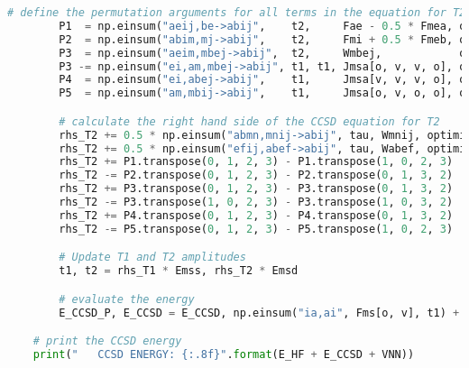 \begin{lstlisting}[language=Python, caption={\acrshort{ccd} and \acrshort{ccsd} method exercise code solution.}, label=code:cc_solution]
        # define the permutation arguments for all terms in the equation for T2
        P1  = np.einsum("aeij,be->abij",    t2,     Fae - 0.5 * Fmea, optimize=True)
        P2  = np.einsum("abim,mj->abij",    t2,     Fmi + 0.5 * Fmeb, optimize=True)
        P3  = np.einsum("aeim,mbej->abij",  t2,     Wmbej,            optimize=True)
        P3 -= np.einsum("ei,am,mbej->abij", t1, t1, Jmsa[o, v, v, o], optimize=True)
        P4  = np.einsum("ei,abej->abij",    t1,     Jmsa[v, v, v, o], optimize=True)
        P5  = np.einsum("am,mbij->abij",    t1,     Jmsa[o, v, o, o], optimize=True)

        # calculate the right hand side of the CCSD equation for T2
        rhs_T2 += 0.5 * np.einsum("abmn,mnij->abij", tau, Wmnij, optimize=True)
        rhs_T2 += 0.5 * np.einsum("efij,abef->abij", tau, Wabef, optimize=True)
        rhs_T2 += P1.transpose(0, 1, 2, 3) - P1.transpose(1, 0, 2, 3)
        rhs_T2 -= P2.transpose(0, 1, 2, 3) - P2.transpose(0, 1, 3, 2)
        rhs_T2 += P3.transpose(0, 1, 2, 3) - P3.transpose(0, 1, 3, 2)
        rhs_T2 -= P3.transpose(1, 0, 2, 3) - P3.transpose(1, 0, 3, 2)
        rhs_T2 += P4.transpose(0, 1, 2, 3) - P4.transpose(0, 1, 3, 2)
        rhs_T2 -= P5.transpose(0, 1, 2, 3) - P5.transpose(1, 0, 2, 3)

        # Update T1 and T2 amplitudes
        t1, t2 = rhs_T1 * Emss, rhs_T2 * Emsd

        # evaluate the energy
        E_CCSD_P, E_CCSD = E_CCSD, np.einsum("ia,ai", Fms[o, v], t1) + 0.25 * np.einsum("ijab,abij", Jmsa[o, o, v, v], t2) + 0.5 * np.einsum("ijab,ai,bj", Jmsa[o, o, v, v], t1, t1)

    # print the CCSD energy
    print("   CCSD ENERGY: {:.8f}".format(E_HF + E_CCSD + VNN))
\end{lstlisting}
